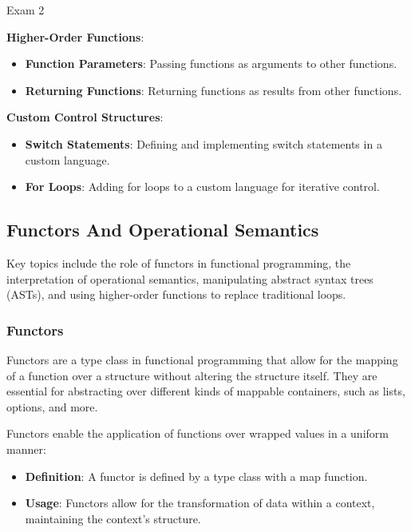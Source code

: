 \begin{examnotes}{Exam 2}
\begin{highlight}
        \textbf{Higher-Order Functions}:
        \begin{itemize}
            \item \textbf{Function Parameters}: Passing functions as arguments to other functions.
            \item \textbf{Returning Functions}: Returning functions as results from other functions.
        \end{itemize}
        
        \textbf{Custom Control Structures}:
        \begin{itemize}
            \item \textbf{Switch Statements}: Defining and implementing switch statements in a custom language.
            \item \textbf{For Loops}: Adding for loops to a custom language for iterative control.
        \end{itemize}
    \end{highlight}

    \subsection*{Functors And Operational Semantics}

    Key topics include the role of functors in functional programming, the interpretation of operational semantics, manipulating abstract syntax trees (ASTs), and using higher-order functions to replace traditional loops.
    
    \subsubsection*{Functors}
    
    Functors are a type class in functional programming that allow for the mapping of a function over a structure without altering the structure itself. They are essential for abstracting over different 
    kinds of mappable containers, such as lists, options, and more.
    
    \begin{highlight}
        Functors enable the application of functions over wrapped values in a uniform manner:
        \begin{itemize}
            \item \textbf{Definition}: A functor is defined by a type class with a map function.
            \item \textbf{Usage}: Functors allow for the transformation of data within a context, maintaining the context's structure.
        \end{itemize}
    \end{highlight}
    

\end{examnotes}
